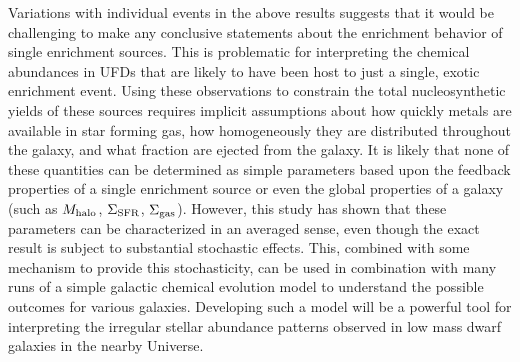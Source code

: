 Variations with individual events in the above results suggests that it would be challenging to make any conclusive statements about the enrichment behavior of single enrichment sources. This is problematic for interpreting the chemical abundances in UFDs that are likely to have been host to just a single, exotic enrichment event. Using these observations to constrain the total nucleosynthetic yields of these sources requires implicit assumptions about how quickly metals are available in star forming gas, how homogeneously they are distributed throughout the galaxy, and what fraction are ejected from the galaxy. It is likely that none of these quantities can be determined as simple parameters based upon the feedback properties of a single enrichment source or even the global properties of a galaxy (such as $M_{\rm halo}$, $\Sigma_{\rm SFR}$, $\Sigma_{\rm gas}$). However, this study has shown that these parameters can be characterized in an averaged sense, even though the exact result is subject to substantial stochastic effects. This, combined with some mechanism to provide this stochasticity, can be used in combination with many runs of a simple galactic chemical evolution model to understand the possible outcomes for various galaxies. Developing such a model will be a powerful tool for interpreting the irregular stellar abundance patterns observed in low mass dwarf galaxies in the nearby Universe.




\setcounter{section}{0}%
\renewcommand\thesection{\thechapter.\Alph{section}}

%
%

\renewcommand\thesection{\thechapter.\arabic{section}}
